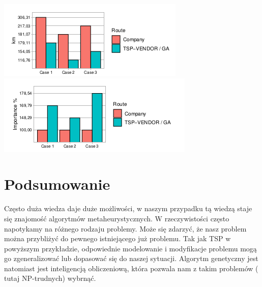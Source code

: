 \documentclass[11pt]{article}
\begin{document}
\includegraphics[scale=1.0]{gr2.png}
\includegraphics[scale=1.0]{gr3.png}
\section{Podsumowanie}
Często duża wiedza daje duże możliwości, w naszym przypadku tą wiedzą staje się znajomość algorytmów metaheurystycznych. W rzeczywistości często napotykamy na różnego rodzaju problemy. Może się zdarzyć, że nasz problem można przybliżyć do pewnego istniejącego już problemu. Tak jak TSP w powyższym przykładzie, odpowiednie modelowanie i modyfikacje problemu mogą go zgeneralizować lub dopasować się do naszej sytuacji. Algorytm genetyczny jest natomiast jest inteligencją obliczeniową, która pozwala nam z takim problemów ( tutaj NP-trudnych) wybrnąć.
\end{document}
